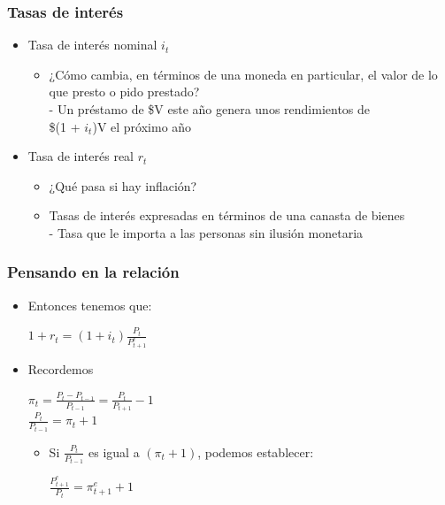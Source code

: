 \documentclass{beamer}
\begin{document}
\begin{frame}
\frametitle{Tasas de interés}
\begin{itemize}
    \item Tasa de interés nominal $i_t$
    \begin{itemize}
        \item ¿Cómo cambia, en términos de una moneda en particular, el valor de lo que presto o pido prestado? \\
        - Un préstamo de \$V este año genera unos rendimientos de \\ \$(1 + $i_t$)V el próximo año
    \end{itemize} \vspace{4mm}
    \item Tasa de interés real $r_t$
    \begin{itemize}
        \item ¿Qué pasa si hay inflación?
        \item Tasas de interés expresadas en términos de una canasta de bienes \\
        - Tasa que le importa a las personas sin ilusión monetaria
        \end{itemize}
    \end{itemize}
\end{frame}

\begin{frame}
\frametitle{Pensando en la relación}
\begin{itemize}
    \item Entonces tenemos que:\\
    \vspace{2mm}
    \begin{center}
        $1+r_t=(1+i_t)\frac{P_t}{P_{t+1}^{e}}$
    \end{center}
        \vspace{2mm}
    \item Recordemos \\      
    \begin{center}
        $\pi_t=\frac{P_t - P_{t-1}}{P_{t-1}}=\frac{P_t}{P_{t+1}} - 1 $ \\
    \vspace{2mm}
            $\frac{P_t}{P_{t-1}}= \pi_t + 1 $
    \end{center}
\begin{itemize}
    \item Si $\frac{P_t}{P_{t-1}}$ es igual a $(\pi_t + 1)$, podemos establecer:
    \vspace{2mm}
        \begin{center}
            $\frac{P_{t+1}^e}{P_{t}}= \pi_{t+1}^e + 1 $
    \end{center}
\end{itemize} 
\end{itemize}
\end{frame}
\end{document}
